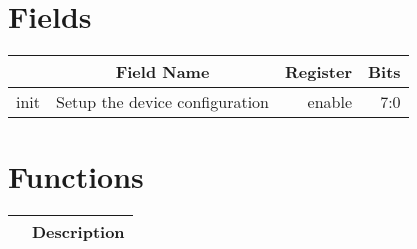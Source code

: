 \documentclass[a4paper,12pt,oneside,pdflatex,italian,final,twocolumn]{article}
\begin{document}
\raggedright

\section{Fields}

\centering
\begin{tabular}{lcrr}
\toprule
  & Field Name & Register & Bits \\
\midrule
init & Setup the device configuration & enable &
7:0
\\

\bottomrule
\end{tabular}

\raggedright

\section{Functions}

\centering
\begin{tabular}{lc}
\toprule
  & Description \\
\midrule
\bottomrule
\end{tabular}
\end{document}

